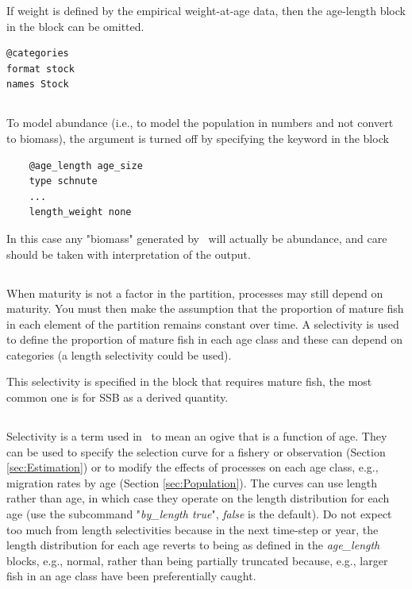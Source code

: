 If weight is defined by the empirical weight-at-age data, then the age-length block in the  block can be omitted.

{\small{\begin{verbatim}
@categories
format stock
names Stock
\end{verbatim}}}

\subsection{\label{sec:weightless-model}}

To model abundance (i.e., to model the population in numbers and not convert to biomass), the  argument is turned off by specifying the keyword  in the  block

{\small{\begin{verbatim}
	@age_length age_size
	type schnute
	...
	length_weight none
	\end{verbatim}}}

In this case any "biomass" generated by \CNAME\ will actually be abundance, and care should be taken with interpretation of the output.

\subsection{\label{sec:maturity-notinpartition}}

When maturity is not a factor in the partition, processes may still depend on maturity. You must then make the assumption that the proportion of mature fish in each element of the partition remains constant over time. A selectivity is used to define the proportion of mature fish in each age class and these can depend on categories (a length selectivity could be used).

This selectivity is specified in the block that requires mature fish, the most common one is for SSB as a derived quantity.

\subsection{\label{sec:Selectivity}}

Selectivity is a term used in \CNAME\  to mean an ogive that is a function of age. They can be used to specify the selection curve for a fishery or observation  (Section \ref{sec:Estimation}) or to modify the effects of processes on each age class, e.g., migration rates by age (Section \ref{sec:Population}). The curves can use length rather than age, in which case they operate on the length distribution for each age (use the subcommand "\textit{by\_length true}", \textit{false} is the default). Do not expect too much from length selectivities because in the next time-step or year, the length distribution for each age reverts to being as defined in the \textit{age\_length} blocks, e.g., normal, rather than being partially truncated because, e.g., larger fish in an age class have been preferentially caught.


